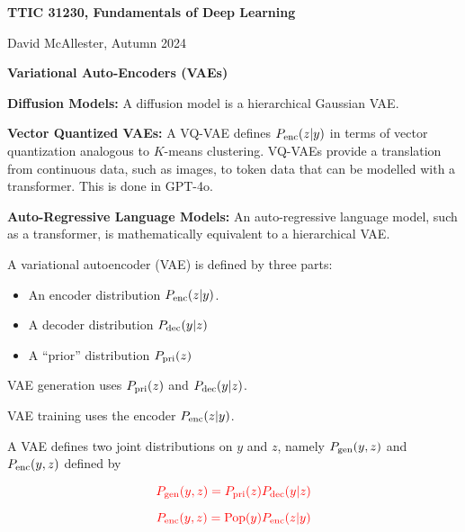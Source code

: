 




{\Huge

  \centerline{\bf TTIC 31230, Fundamentals of Deep Learning}

\bigskip

\centerline{David McAllester, Autumn  2024}

\vfill \vfill

\centerline{\bf Variational Auto-Encoders (VAEs)}

\vfill \vfill


{\bf Diffusion Models:} A diffusion model is a hierarchical Gaussian VAE.

\vfill
{\bf Vector Quantized VAEs:} A VQ-VAE defines $P_{\mathrm{enc}}(z|y)$ in terms of vector quantization analogous to $K$-means clustering.
VQ-VAEs provide a translation from continuous data, such as images, to token data that can be modelled with a transformer.
This is done in GPT-4o.

\vfill
{\bf Auto-Regressive Language Models:} An auto-regressive language model, such as a transformer, is mathematically equivalent to a hierarchical VAE.

A variational autoencoder (VAE) is defined by three parts:

\vfill
\begin{itemize}
\item An encoder distribution $P_{\mathrm{enc}}(z|y)$.

\vfill
\item A decoder distribution $P_{\mathrm{dec}}(y|z)$

\vfill
\item A ``prior'' distribution $P_{\mathrm{pri}}(z)$

\end{itemize}

\vfill
VAE generation uses $P_{\mathrm{pri}}(z)$ and $P_{\mathrm{dec}}(y|z)$.

\vfill
VAE training uses the encoder $P_{\mathrm{enc}}(z|y)$.


A VAE defines two joint distributions on $y$ and $z$, namely $P_{\mathrm{gen}}(y,z)$ and $P_{\mathrm{enc}}(y,z)$ defined by

\vfill
$${\color{red} P_{\mathrm{gen}}(y,z) = P_{\mathrm{pri}}(z)P_{\mathrm{dec}}(y|z)}$$

\vfill
$${\color{red} P_{\mathrm{enc}}(y,z) = \mathrm{Pop}(y)P_{\mathrm{enc}}(z|y)}$$

}
